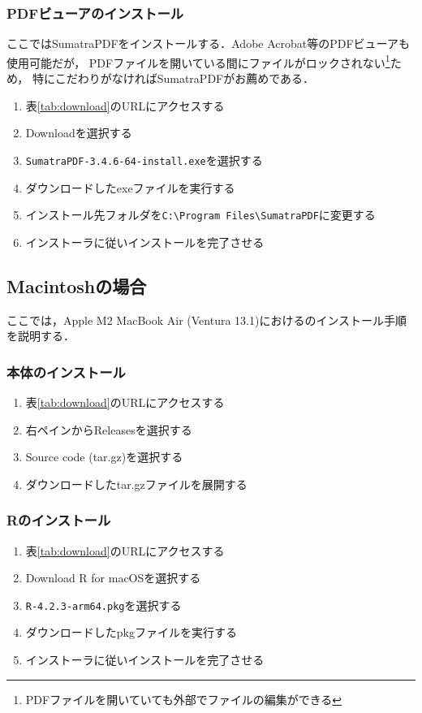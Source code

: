 \subsubsection{PDFビューアのインストール}
ここではSumatraPDFをインストールする．Adobe Acrobat等のPDFビューアも使用可能だが，
PDFファイルを開いている間にファイルがロックされない\footnote{PDFファイルを開いていても外部でファイルの編集ができる}ため，
特にこだわりがなければSumatraPDFがお薦めである．
\begin{enumerate}
    \item 表\ref{tab:download}のURLにアクセスする
    \item Downloadを選択する
    \item \verb|SumatraPDF-3.4.6-64-install.exe|を選択する
    \item ダウンロードしたexeファイルを実行する
    \item インストール先フォルダを\verb|C:\Program Files\SumatraPDF|に変更する
    \item インストーラに従いインストールを完了させる
\end{enumerate}

\subsection{Macintoshの場合}

ここでは，Apple M2 MacBook Air (Ventura 13.1)における{\ketcindy}のインストール手順を説明する．

\subsubsection{{\ketcindy}本体のインストール}
\begin{enumerate}
    \item 表\ref{tab:download}のURLにアクセスする
    \item 右ペインからReleasesを選択する
    \item Source code (tar.gz)を選択する
    \item ダウンロードしたtar.gzファイルを展開する
\end{enumerate}

\subsubsection{Rのインストール}
\begin{enumerate}
    \item 表\ref{tab:download}のURLにアクセスする
    \item Download R for macOSを選択する
    \item \verb|R-4.2.3-arm64.pkg|を選択する
    \item ダウンロードしたpkgファイルを実行する
    \item インストーラに従いインストールを完了させる
\end{enumerate}

